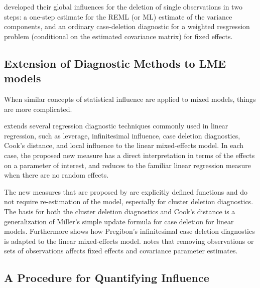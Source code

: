 \documentclass[12pt, a4paper]{report}
\theoremstyle{plain}
\theoremstyle{definition}
\theoremstyle{remark}
\begin{document}
\citet{Christensen} developed their global influences for the deletion of single observations in two steps: a one-step estimate for the REML (or ML) estimate of the variance components, and an ordinary case-deletion diagnostic for a weighted resgression problem (conditional on the estimated covariance matrix) for fixed effects.
	


\subsection{Extension of Diagnostic Methods to LME models}

When similar concepts of statistical influence are applied to mixed models, things are more complicated. 



\citet{Demi} extends several regression diagnostic techniques commonly used in linear regression, such as leverage, infinitesimal influence, case deletion diagnostics, Cook's distance, and local influence to the linear mixed-effects model. In each case, the proposed new measure has a direct interpretation in terms of the effects on a parameter of interest, and reduces to the familiar linear regression measure when there are no random effects.

The new measures that are proposed by \citet{Demi} are explicitly defined functions and do not require re-estimation of the model, especially for cluster deletion diagnostics. The basis for both the cluster deletion diagnostics and Cook's distance is a generalization of Miller's simple update formula for case deletion for linear models. Furthermore \citet{Demi} shows how Pregibon's infinitesimal case deletion diagnostics is adapted to the linear mixed-effects model. \citet{schabenberger} notes that removing observations or sets of observations affects fixed effects and covariance parameter estimates.

	\subsection{A Procedure for Quantifying Influence}  %
	
\end{document}
